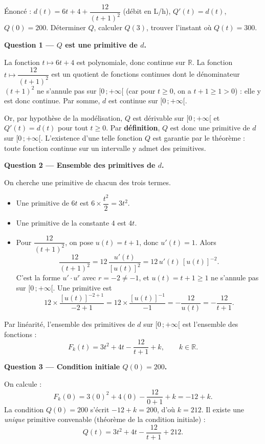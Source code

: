 \documentclass[11pt]{article}
\newcommand{\cle}[1]{{\popxbold\color{popdark}#1}}
\begin{document}
\begin{exoresolu}
Énoncé : $d(t) = 6t + 4 + \dfrac{12}{(t+1)^{2}}$ (débit en L/h), $Q'(t) = d(t)$, $Q(0) = 200$. Déterminer $Q$, calculer $Q(3)$, trouver l'instant où $Q(t) = 300$.

\tcblower

\textbf{Question 1 — $Q$ est une primitive de $d$.}

La fonction $t \mapsto 6t+4$ est polynomiale, donc continue sur $\mathbb{R}$. La fonction $t \mapsto \dfrac{12}{(t+1)^{2}}$ est un quotient de fonctions continues dont le dénominateur $(t+1)^{2}$ ne s'annule pas sur $[0\,; +\infty[$ (car pour $t \geq 0$, on a $t+1 \geq 1 > 0$) : elle y est donc continue. Par somme, $d$ est \cle{continue} sur $[0\,; +\infty[$.

Or, par hypothèse de la modélisation, $Q$ est dérivable sur $[0\,; +\infty[$ et $Q'(t) = d(t)$ pour tout $t \geq 0$. Par \textbf{définition}, $Q$ est donc une \cle{primitive} de $d$ sur $[0\,; +\infty[$. L'existence d'une telle fonction $Q$ est garantie par le théorème : toute fonction continue sur un intervalle y admet des primitives.

\medskip
\textbf{Question 2 — Ensemble des primitives de $d$.}

On cherche une primitive de chacun des trois termes.
\begin{itemize}
\item Une primitive de $6t$ est $6 \times \dfrac{t^{2}}{2} = 3t^{2}$.
\item Une primitive de la constante $4$ est $4t$.
\item Pour $\dfrac{12}{(t+1)^{2}}$, on pose $u(t) = t+1$, donc $u'(t) = 1$. Alors
\[ \frac{12}{(t+1)^{2}} = 12\,\frac{u'(t)}{[u(t)]^{2}} = 12\,u'(t)\,[u(t)]^{-2}. \]
C'est la forme $u'\cdot u^{r}$ avec $r = -2 \neq -1$, et $u(t) = t+1 \geq 1$ ne s'annule pas sur $[0\,; +\infty[$. Une primitive est
\[ 12 \times \frac{[u(t)]^{-2+1}}{-2+1} = 12 \times \frac{[u(t)]^{-1}}{-1} = -\frac{12}{u(t)} = -\frac{12}{t+1}. \]
\end{itemize}
Par linéarité, l'ensemble des primitives de $d$ sur $[0\,; +\infty[$ est l'ensemble des fonctions :
\[ F_{k}(t) = 3t^{2} + 4t - \frac{12}{t+1} + k, \qquad k \in \mathbb{R}. \]

\medskip
\textbf{Question 3 — Condition initiale $Q(0) = 200$.}

On calcule :
\[ F_{k}(0) = 3(0)^{2} + 4(0) - \frac{12}{0+1} + k = -12 + k. \]
La condition $Q(0) = 200$ s'écrit $-12 + k = 200$, d'où $k = 212$. Il existe une \emph{unique} primitive convenable (théorème de la condition initiale) :
\[ Q(t) = 3t^{2} + 4t - \frac{12}{t+1} + 212. \]


\end{exoresolu}
\end{document}
